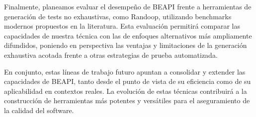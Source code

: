 Finalmente, planeamos evaluar el desempeño de BEAPI frente a herramientas de generación de tests no exhaustivas, como Randoop, 
utilizando benchmarks modernos propuestos en la literatura. Esta evaluación permitirá comparar las capacidades de nuestra técnica con las de enfoques alternativos más ampliamente difundidos, 
poniendo en perspectiva las ventajas y limitaciones de la generación exhaustiva acotada frente a otras estrategias de prueba automatizada.

En conjunto, estas líneas de trabajo futuro apuntan a consolidar y extender las capacidades de BEAPI, 
tanto desde el punto de vista de su eficiencia como de su aplicabilidad en contextos reales. 
La evolución de estas técnicas contribuirá a la construcción de herramientas más potentes y versátiles para el aseguramiento de la calidad del software.
